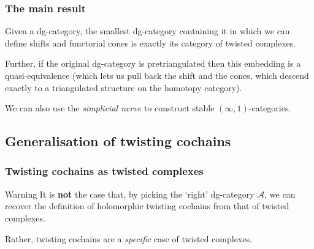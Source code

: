 \documentclass{beamer}
\begin{document}
        \begin{frame}\frametitle{The main result}
            \begin{theorem}
                Given a dg-category, the smallest dg-category containing it in which we can define shifts and functorial cones is exactly its category of twisted complexes.

                \pause

                Further, if the original dg-category is pretriangulated then this embedding is a quasi-equivalence (which lets us pull back the shift and the cones, which descend exactly to a triangulated structure on the homotopy category).

                \pause

                We can also use the \emph{simplicial nerve} to construct stable $(\infty,1)$-categories.
            \end{theorem}
        \end{frame}
    
    \subsection{Generalisation of twisting cochains}

        \begin{frame}\frametitle{Twisting cochains as twisted complexes}
            \begin{alertblock}{Warning}
                It is \textbf{not} the case that, by picking the `right' dg-category $\mathcal{A}$, we can recover the definition of holomorphic twisting cochains from that of twisted complexes.

                \pause

                Rather, twisting cochains are a \emph{specific} case of twisted complexes.
            \end{alertblock}
        \end{frame}
\end{document}
